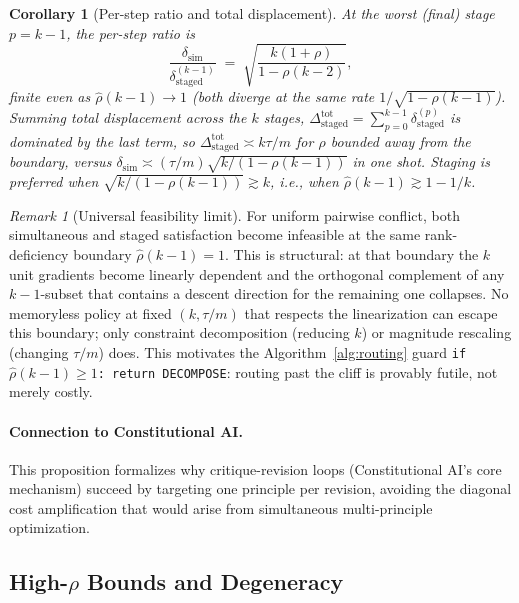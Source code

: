 \documentclass{article}
\theoremstyle{plain}
\newtheorem{corollary}[theorem]{Corollary}
\theoremstyle{definition}
\theoremstyle{remark}
\newtheorem{remark}[theorem]{Remark}
\newcommand{\rhohat}{\hat{\rho}}
\begin{document}
\begin{corollary}[Per-step ratio and total displacement]\label{cor:staging_ratio}
At the worst (final) stage $p = k-1$, the per-step ratio is
\[
\frac{\delta_{\text{sim}}}{\delta_{\text{staged}}^{(k-1)}} \;=\; \sqrt{\frac{k(1+\rho)}{1-\rho(k-2)}},
\]
finite even as $\rhohat(k-1) \to 1$ (both diverge at the same rate $1/\sqrt{1-\rho(k-1)}$). Summing total displacement across the $k$ stages, $\Delta_{\text{staged}}^{\text{tot}} = \sum_{p=0}^{k-1} \delta_{\text{staged}}^{(p)}$ is dominated by the last term, so $\Delta_{\text{staged}}^{\text{tot}} \asymp k\tau/m$ for $\rho$ bounded away from the boundary, versus $\delta_{\text{sim}} \asymp (\tau/m)\sqrt{k/(1-\rho(k-1))}$ in one shot. Staging is preferred when $\sqrt{k/(1-\rho(k-1))} \gtrsim k$, i.e., when $\rhohat(k-1) \gtrsim 1 - 1/k$.
\end{corollary}

\begin{remark}[Universal feasibility limit]\label{rem:universal_boundary}
For uniform pairwise conflict, both simultaneous and staged satisfaction become infeasible at the same rank-deficiency boundary $\rhohat(k-1) = 1$. This is structural: at that boundary the $k$ unit gradients become linearly dependent and the orthogonal complement of any $k{-}1$-subset that contains a descent direction for the remaining one collapses. No memoryless policy at fixed $(k, \tau/m)$ that respects the linearization can escape this boundary; only constraint decomposition (reducing $k$) or magnitude rescaling (changing $\tau/m$) does. This motivates the Algorithm~\ref{alg:routing} guard \texttt{if $\rhohat(k-1) \ge 1$: return DECOMPOSE}: routing past the cliff is provably futile, not merely costly.
\end{remark}

\paragraph{Connection to Constitutional AI.}
This proposition formalizes why critique-revision loops (Constitutional AI's core mechanism) succeed by targeting one principle per revision, avoiding the diagonal cost amplification that would arise from simultaneous multi-principle optimization.

\subsection{High-$\rho$ Bounds and Degeneracy}\label{app:high_R}
\end{document}
